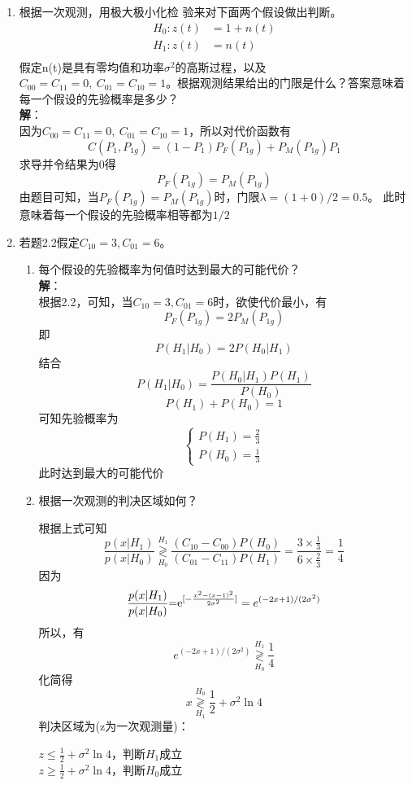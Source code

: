 \documentclass{article}
\begin{document}
\begin{enumerate}[1.]
\item 
根据一次观测，用极大极小化检
验来对下面两个假设做出判断。
\begin{equation*}
\begin{split}
H_0:z(t)&=1+n(t)\\
H_1:z(t)&=n(t)\\
\end{split}
\end{equation*}
假定n(t)是具有零均值和功率$\sigma^2$的高斯过程，以及$C_{00}=C_{11}=0,\ C_{01}=C_{10}=1$。根据观测结果给出的门限是什么？答案意味着每一个假设的先验概率是多少？\\
\textbf{解}：\\
因为$C_{00}=C_{11}=0,\ C_{01}=C_{10}=1$，所以对代价函数有
$$C(P_1,P_{1g})=(1-P_1)P_F(P_{1g})+P_M(P_{1g})P_1$$
求导并令结果为0得
$$P_F(P_{1g})=P_M(P_{1g})$$
由题目可知，当$P_F(P_{1g})=P_M(P_{1g})$时，门限$\lambda=(1+0)/2=0.5$。
此时意味着每一个假设的先验概率相等都为$1/2$


\item
若题2.2假定$C_{10}=3,C_{01}=6$。
\begin{enumerate}[(1)]
\item
每个假设的先验概率为何值时达到最大的可能代价？\\
\textbf{解}：\\
根据2.2，可知，当$C_{10}=3,C_{01}=6$时，欲使代价最小，有
$$P_F(P_{1g})=2P_M(P_{1g})$$
即
\[P({H_1}|{H_0}) = 2P({H_0}|{H_1})\]
结合
\[P({H_1}|{H_0}) = \frac{{P({H_0}|{H_1})P({H_1})}}{{P({H_0})}}\]
\[P({H_1}) + P({H_0}) = 1\]
可知先验概率为
\[\left\{ \begin{array}{l}
P({H_1}) = \frac{2}{3}\\
P({H_0}) = \frac{1}{3}
\end{array} \right.\]
此时达到最大的可能代价
\item
根据一次观测的判决区域如何？

根据上式可知
\[\frac{{p(x|{H_1})}}{{p(x|{H_0})}}\mathop{\gtrless} \limits_{{H_0}}^{{H_1}} \frac{{({C_{10}} - {C_{00}})P({H_0})}}{{({C_{01}} - {C_{11}})P({H_1})}} = \frac{{3 \times \frac{1}{3}}}{{6 \times \frac{2}{3}}} = \frac{1}{4}\]
因为
\[\frac{{p(x|{H_1})}}{{p(x|{H_0})}}{\rm{ = }}{{\rm{e}}^{[ - \frac{{{x^2} - {{(x - 1)}^2}}}{{2{\sigma ^2}}}]}} = {e^{( - 2x + 1)/(2{\sigma ^2})}}\]
所以，有
\[{e^{( - 2x + 1)/(2{\sigma ^2})}}\mathop{\gtrless}\limits_{{H_0}}^{{H_1}} \frac{1}{4}\]
化简得
\[x\mathop{\gtrless} \limits_{{H_1}}^{{H_0}} \frac{1}{2} + {\sigma ^2}\ln4\]
判决区域为(z为一次观测量)：
\begin{center}
$z\le\frac{1}{2} + {\sigma ^2}\ln 4$，判断$H_1$成立\\
$z\ge\frac{1}{2} + {\sigma ^2}\ln 4$，判断$H_0$成立\\
\end{center}


\end{enumerate}
\end{enumerate}
\end{document}
